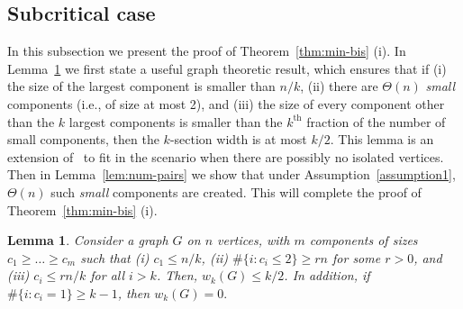 \documentclass[11pt,a4paper, reqno]{article}
\numberwithin{equation}{section}
\numberwithin{equation}{section}
\newcommand{\1}{\ensuremath{\mathbbm{1}}}
\newtheorem{lemma}[theorem]{Lemma}
\numberwithin{equation}{section}
\numberwithin{theorem}{section}
\begin{document}
\subsection{Subcritical case} 
\label{ssec:ksection-subcrit}
In this subsection we present the proof of Theorem~\ref{thm:min-bis} (i).
In Lemma~\ref{lem:graph-sub} we first state a useful graph theoretic result, which ensures that if (i) the size of the largest component is smaller than $n/k$,
(ii) there are $\Theta(n)$ \emph{small} components (i.e., of size at most 2), and
 (iii) the size  of every component other than the $k$ largest components is smaller than the $k^{\mathrm{th}}$ fraction of the number of small components,    then the $k$-section width is at most $k/2$.
 This lemma is an extension of~{\cite[Lemma 9]{LM01}} to fit in the scenario when there are possibly no isolated vertices.
Then in Lemma~\ref{lem:num-pairs} we show that under Assumption~\ref{assumption1}, $\Theta(n)$ such \emph{small} components are created.
This will complete the proof of Theorem~\ref{thm:min-bis} (i).
\begin{lemma} 
\label{lem:graph-sub}
Consider a graph $G$ on $n$ vertices, with $m$ components of sizes $c_1\geq \dots\geq c_m$ such that 
(i) $c_1\leq n/k$, 
(ii) $\#\{i:c_i\leq 2\}\geq rn$ for some $r>0$, and
(iii) $c_i\leq rn/k$ for all $i>k$. 
Then, $w_k(G)\leq k/2$.
In addition, if $\#\{i:c_i=1\}\geq k-1$, then  $w_k(G)=0.$
\end{lemma}
\end{document}
